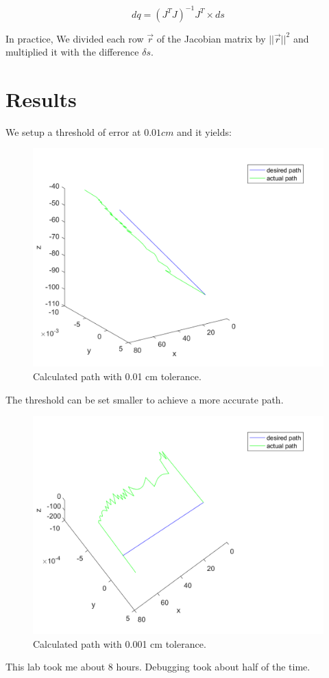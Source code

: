 \documentclass{article}
\begin{document}
\begin{equation}
	dq = (J^TJ)^{-1}J^T \times ds 
\end{equation}

In practice, We divided each row $\vec{r}$ of the Jacobian matrix by $||\vec{r}||^2$ and multiplied it with the difference $\delta s$.

\section{Results}

We setup a threshold of error at $0.01 cm$ and it yields:

\begin{figure}[H]
\centering
\includegraphics[width=\textwidth]{difference}
\caption{Calculated path with 0.01 cm tolerance.}
\end{figure}

The threshold can be set smaller to achieve a more accurate path.

\begin{figure}[H]
\centering
\includegraphics[width=\textwidth]{difference0_001}
\caption{Calculated path with 0.001 cm tolerance.}
\end{figure}

This lab took me about 8 hours. Debugging took about half of the time.
\end{document}
